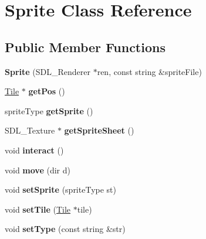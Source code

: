 \hypertarget{class_sprite}{}\section{Sprite Class Reference}
\label{class_sprite}
\subsection*{Public Member Functions}
\begin{DoxyCompactItemize}
\item 
{\bfseries Sprite} (S\+D\+L\+\_\+\+Renderer $\ast$ren, const string \&sprite\+File)\hypertarget{class_sprite_aae9fc5691e7263139e9e8d1d969cba5c}{}\label{class_sprite_aae9fc5691e7263139e9e8d1d969cba5c}

\item 
\hyperlink{class_tile}{Tile} $\ast$ {\bfseries get\+Pos} ()\hypertarget{class_sprite_a6c4961079fab937172061be32d654e85}{}\label{class_sprite_a6c4961079fab937172061be32d654e85}

\item 
sprite\+Type {\bfseries get\+Sprite} ()\hypertarget{class_sprite_a01742e39c9f18622a094a187d6858912}{}\label{class_sprite_a01742e39c9f18622a094a187d6858912}

\item 
S\+D\+L\+\_\+\+Texture $\ast$ {\bfseries get\+Sprite\+Sheet} ()\hypertarget{class_sprite_abec247d2cd9396834344c3cfe81eddc1}{}\label{class_sprite_abec247d2cd9396834344c3cfe81eddc1}

\item 
void {\bfseries interact} ()\hypertarget{class_sprite_a5ca2adc18eeb5290160a5d035992d937}{}\label{class_sprite_a5ca2adc18eeb5290160a5d035992d937}

\item 
void {\bfseries move} (dir d)\hypertarget{class_sprite_a376d5d03359afd9cdfc6e0b07f22ff37}{}\label{class_sprite_a376d5d03359afd9cdfc6e0b07f22ff37}

\item 
void {\bfseries set\+Sprite} (sprite\+Type st)\hypertarget{class_sprite_aa9d0dd6123988d79c94a18f3e404d8d7}{}\label{class_sprite_aa9d0dd6123988d79c94a18f3e404d8d7}

\item 
void {\bfseries set\+Tile} (\hyperlink{class_tile}{Tile} $\ast$tile)\hypertarget{class_sprite_adc65cbc668aa239bc359156bfb5e3f89}{}\label{class_sprite_adc65cbc668aa239bc359156bfb5e3f89}

\item 
void {\bfseries set\+Type} (const string \&str)\hypertarget{class_sprite_a0c2efc62131a56a1c81405527a930b71}{}\label{class_sprite_a0c2efc62131a56a1c81405527a930b71}

\end{DoxyCompactItemize}
